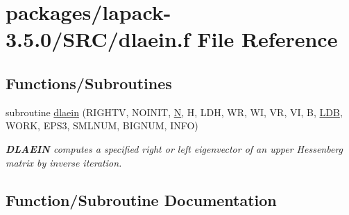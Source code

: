 \hypertarget{dlaein_8f}{}\section{packages/lapack-\/3.5.0/\+S\+R\+C/dlaein.f File Reference}
\label{dlaein_8f}
\subsection*{Functions/\+Subroutines}
\begin{DoxyCompactItemize}
\item 
subroutine \hyperlink{dlaein_8f_a10da782c8833b0a63452726912c827b3}{dlaein} (R\+I\+G\+H\+T\+V, N\+O\+I\+N\+I\+T, \hyperlink{polmisc_8c_a0240ac851181b84ac374872dc5434ee4}{N}, H, L\+D\+H, W\+R, W\+I, V\+R, V\+I, B, \hyperlink{example__user_8c_a50e90a7104df172b5a89a06c47fcca04}{L\+D\+B}, W\+O\+R\+K, E\+P\+S3, S\+M\+L\+N\+U\+M, B\+I\+G\+N\+U\+M, I\+N\+F\+O)
\begin{DoxyCompactList}\small\item\em {\bfseries D\+L\+A\+E\+I\+N} computes a specified right or left eigenvector of an upper Hessenberg matrix by inverse iteration. \end{DoxyCompactList}\end{DoxyCompactItemize}


\subsection{Function/\+Subroutine Documentation}
\hypertarget{dlaein_8f_a10da782c8833b0a63452726912c827b3}{}
